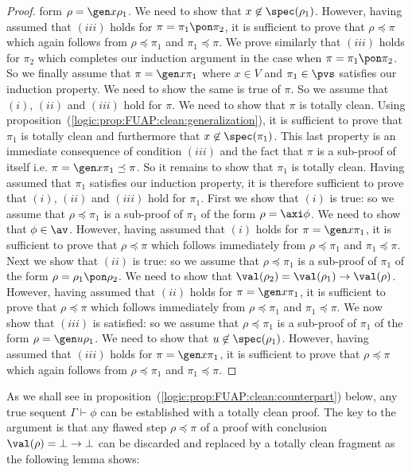 \begin{proof}
form $\rho=\gen x\rho_{1}$. We need to show that
$x\not\in\spec(\rho_{1})$. However, having assumed that $(iii)$
holds for $\pi=\pi_{1}\pon\pi_{2}$, it is sufficient to prove that
$\rho\preceq\pi$ which again follows from $\rho\preceq\pi_{1}$ and
$\pi_{1}\preceq\pi$. We prove similarly that $(iii)$ holds for
$\pi_{2}$ which completes our induction argument in the case when
$\pi=\pi_{1}\pon\pi_{2}$. So we finally assume that $\pi=\gen
x\pi_{1}$ where $x\in V$ and $\pi_{1}\in\pvs$ satisfies our
induction property. We need to show the same is true of $\pi$. So we
assume that $(i)$, $(ii)$ and $(iii)$ hold for $\pi$. We need to
show that $\pi$ is totally clean. Using
proposition~(\ref{logic:prop:FUAP:clean:generalization}), it is
sufficient to prove that $\pi_{1}$ is totally clean and furthermore
that $x\not\in\spec(\pi_{1})$. This last property is an immediate
consequence of condition $(iii)$ and the fact that $\pi$ is a
sub-proof of itself i.e. $\pi=\gen x\pi_{1}\preceq\pi$. So it
remains to show that $\pi_{1}$ is totally clean. Having assumed that
$\pi_{1}$ satisfies our induction property, it is therefore
sufficient to prove that $(i)$, $(ii)$ and $(iii)$ hold for
$\pi_{1}$. First we show that $(i)$ is true: so we assume that
$\rho\preceq\pi_{1}$ is a sub-proof of $\pi_{1}$ of the form
$\rho=\axi\phi$. We need to show that $\phi\in\av$. However, having
assumed that $(i)$ holds for $\pi=\gen x\pi_{1}$, it is sufficient
to prove that $\rho\preceq\pi$ which follows immediately from
$\rho\preceq\pi_{1}$ and $\pi_{1}\preceq\pi$. Next we show that
$(ii)$ is true: so we assume that $\rho\preceq\pi_{1}$ is a
sub-proof of $\pi_{1}$ of the form $\rho=\rho_{1}\pon\rho_{2}$. We
need to show that $\val(\rho_{2})=\val(\rho_{1})\to\val(\rho)$.
However, having assumed that $(ii)$ holds for $\pi=\gen x\pi_{1}$,
it is sufficient to prove that $\rho\preceq\pi$ which follows
immediately from $\rho\preceq\pi_{1}$ and $\pi_{1}\preceq\pi$. We
now show that $(iii)$ is satisfied: so we assume that
$\rho\preceq\pi_{1}$ is a sub-proof of $\pi_{1}$ of the form
$\rho=\gen u\rho_{1}$. We need to show that
$u\not\in\spec(\rho_{1})$. However, having assumed that $(iii)$
holds for $\pi=\gen x\pi_{1}$, it is sufficient to prove that
$\rho\preceq\pi$ which again follows from $\rho\preceq\pi_{1}$ and
$\pi_{1}\preceq\pi$.
\end{proof}

As we shall see in
proposition~(\ref{logic:prop:FUAP:clean:counterpart}) below, any
true sequent $\Gamma\vdash\phi$ can be established with a totally
clean proof. The key to the argument is that any flawed step
$\rho\preceq\pi$ of a proof with conclusion $\val(\rho)=\bot\to\bot$
can be discarded and replaced by a totally clean fragment as the
following lemma shows:

